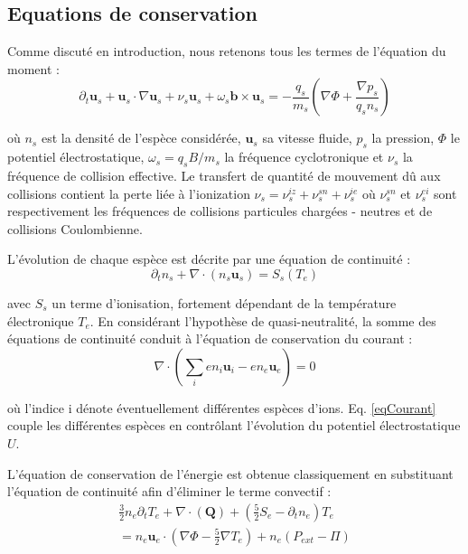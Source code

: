 \subsection{Equations de conservation}
Comme discuté en introduction, nous retenons tous les termes de l'équation du
moment :
\begin{equation}
\partial_t \mathbf{u}_s + \mathbf{u}_s\cdot\nabla\mathbf{u}_s+
\nu_s\mathbf{u}_s+\omega_s\mathbf{b}\times\mathbf{u}_s=
-\frac{q_s}{m_s}\left(\nabla \Phi+\frac{\nabla p_s}{q_sn_s}\right)
\end{equation}

où $n_s$ est la densité de l'espèce considérée, $\mathbf{u}_s$ sa vitesse
fluide, $p_s$ la pression, $\Phi$ le potentiel électrostatique,
$\omega_s=q_sB/m_s$ la fréquence cyclotronique et $\nu_s$ la fréquence de collision effective.
Le transfert de quantité de mouvement dû aux collisions contient la perte liée à
l'ionization $\nu_s=\nu_{s}^{iz}+\nu_{s}^{sn}+\nu_{s}^{ie}$ où $\nu_{s}^{sn}$ et
$\nu_{s}^{ei}$ sont respectivement les fréquences de collisions particules
chargées - neutres et de collisions Coulombienne.

L'évolution de chaque espèce est décrite par une équation de continuité :
\begin{equation}
\label{3-continuite}
\partial_t n_s + \nabla\cdot\left(n_s\mathbf{u}_s\right)=S_s(T_e)
\end{equation}

avec $S_s$ un terme d'ionisation, fortement dépendant de la
température électronique $T_e$. En considérant l'hypothèse de quasi-neutralité, la somme des
équations de continuité conduit à l'équation de conservation du courant :
\begin{equation}
\label{eqCourant}
\nabla\cdot(\sum_ien_i\mathbf{u}_i-en_e\mathbf{u}_e)=0
\end{equation}

où l'indice i dénote éventuellement différentes espèces d'ions. Eq.
\ref{eqCourant} couple les différentes espèces en contrôlant l'évolution du potentiel électrostatique $U$.

L'équation de conservation de l'énergie est obtenue classiquement en substituant
l'équation de continuité afin d'éliminer le terme convectif :
\begin{equation}\begin{split}
\label{eqEnergie}
\frac{3}{2}n_e\partial_tT_e + \nabla\cdot(\mathbf{Q}) +
(\frac{5}{2}S_e-\partial_tn_e)T_e \\=n_e\mathbf{u}_e\cdot(\nabla
\Phi-\frac{5}{2}\nabla T_e)+n_e\left(P_{ext}-\Pi\right)
\end{split}
\end{equation}

